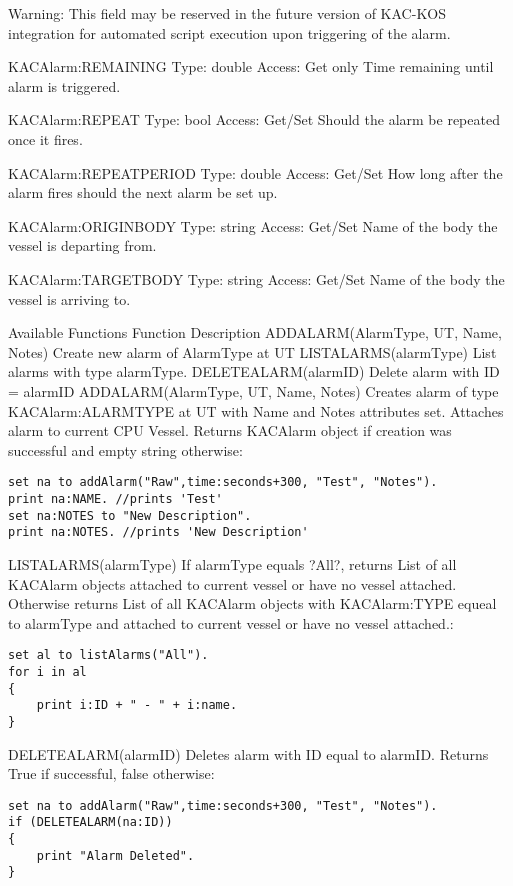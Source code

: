 Warning: This field may be reserved in the future version of KAC-KOS integration for automated script execution upon triggering of the alarm.

KACAlarm:REMAINING
Type:	double
Access:	Get only
Time remaining until alarm is triggered.

KACAlarm:REPEAT
Type:	bool
Access:	Get/Set
Should the alarm be repeated once it fires.

KACAlarm:REPEATPERIOD
Type:	double
Access:	Get/Set
How long after the alarm fires should the next alarm be set up.

KACAlarm:ORIGINBODY
Type:	string
Access:	Get/Set
Name of the body the vessel is departing from.

KACAlarm:TARGETBODY
Type:	string
Access:	Get/Set
Name of the body the vessel is arriving to.

Available Functions
Function	Description
ADDALARM(AlarmType, UT, Name, Notes)	Create new alarm of AlarmType at UT
LISTALARMS(alarmType)	List alarms with type alarmType.
DELETEALARM(alarmID)	Delete alarm with ID = alarmID
ADDALARM(AlarmType, UT, Name, Notes)
Creates alarm of type KACAlarm:ALARMTYPE at UT with Name and Notes attributes set. Attaches alarm to current CPU Vessel. Returns KACAlarm object if creation was successful and empty string otherwise:

\begin{Verbatim}[frame=single]
set na to addAlarm("Raw",time:seconds+300, "Test", "Notes").
print na:NAME. //prints 'Test'
set na:NOTES to "New Description".
print na:NOTES. //prints 'New Description'
\end{Verbatim}

LISTALARMS(alarmType)
If alarmType equals ?All?, returns List of all KACAlarm objects attached to current vessel or have no vessel attached. Otherwise returns List of all KACAlarm objects with KACAlarm:TYPE equeal to alarmType and attached to current vessel or have no vessel attached.:

\begin{Verbatim}[frame=single]
set al to listAlarms("All").
for i in al
{
    print i:ID + " - " + i:name.
}
\end{Verbatim}

DELETEALARM(alarmID)
Deletes alarm with ID equal to alarmID. Returns True if successful, false otherwise:

\begin{Verbatim}[frame=single]
set na to addAlarm("Raw",time:seconds+300, "Test", "Notes").
if (DELETEALARM(na:ID))
{
    print "Alarm Deleted".
}
\end{Verbatim}
